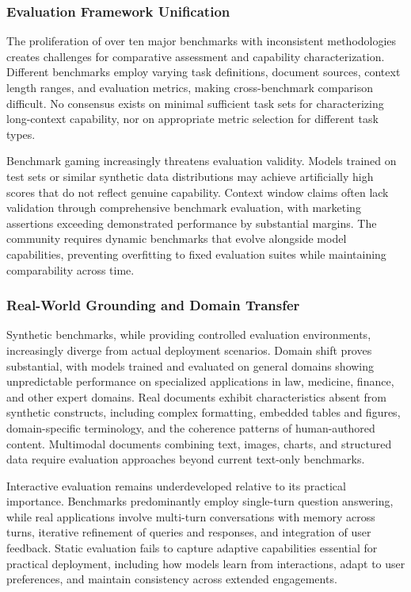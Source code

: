\subsubsection{Evaluation Framework Unification}

The proliferation of over ten major benchmarks with inconsistent methodologies creates challenges for comparative assessment and capability characterization. Different benchmarks employ varying task definitions, document sources, context length ranges, and evaluation metrics, making cross-benchmark comparison difficult. No consensus exists on minimal sufficient task sets for characterizing long-context capability, nor on appropriate metric selection for different task types.

Benchmark gaming increasingly threatens evaluation validity. Models trained on test sets or similar synthetic data distributions may achieve artificially high scores that do not reflect genuine capability. Context window claims often lack validation through comprehensive benchmark evaluation, with marketing assertions exceeding demonstrated performance by substantial margins. The community requires dynamic benchmarks that evolve alongside model capabilities, preventing overfitting to fixed evaluation suites while maintaining comparability across time.

\subsubsection{Real-World Grounding and Domain Transfer}

Synthetic benchmarks, while providing controlled evaluation environments, increasingly diverge from actual deployment scenarios. Domain shift proves substantial, with models trained and evaluated on general domains showing unpredictable performance on specialized applications in law, medicine, finance, and other expert domains. Real documents exhibit characteristics absent from synthetic constructs, including complex formatting, embedded tables and figures, domain-specific terminology, and the coherence patterns of human-authored content. Multimodal documents combining text, images, charts, and structured data require evaluation approaches beyond current text-only benchmarks.

Interactive evaluation remains underdeveloped relative to its practical importance. Benchmarks predominantly employ single-turn question answering, while real applications involve multi-turn conversations with memory across turns, iterative refinement of queries and responses, and integration of user feedback. Static evaluation fails to capture adaptive capabilities essential for practical deployment, including how models learn from interactions, adapt to user preferences, and maintain consistency across extended engagements.

